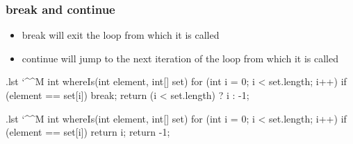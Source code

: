 \documentclass[10pt]{beamer}
\makeatletter
\newenvironment{code}{%
  \begingroup
  \@bsphack
  \immediate\openout\lstvrb@out\jobname.lst
  \let\do\@makeother\dospecials\catcode`\^^M\active
  \def\verbatim@processline{%
    \immediate\write\lstvrb@out{\the\verbatim@line}}%
  \verbatim@start}{%
  \immediate\closeout\lstvrb@out
  \@esphack
  \endgroup
  
  \begin{alertblock}{}
    
  \end{alertblock}}
\makeatother
\begin{document}
\begin{frame}[fragile]
\frametitle{break and continue}
\begin{itemize}
   \item break will exit the loop from which it is called
   \item continue will jump to the next iteration of the loop from which it is called
\end{itemize}

\begin{code}
int whereIs(int element, int[] set) {
  for (int i = 0; i < set.length; i++) {
    if (element == set[i]) {
      break;
    } 
  }
  return (i < set.length) ? i : -1; 
}
\end{code}
\end{frame}

\begin{frame}[fragile]
\begin{code}
int whereIs(int element, int[] set) {
  for (int i = 0; i < set.length; i++) {
    if (element == set[i]) {
      return i;
    } 
  }
  return -1;
}
\end{code}

\end{frame}

\end{document}
